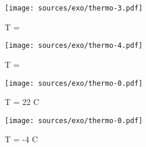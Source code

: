 \documentclass[11pt]{article}
\begin{document}
\begin{multicols}{4}
  \begin{figure}[H]
    \centering
    \texttt{[image: sources/exo/thermo-3.pdf]}
    \caption{T = }
  \end{figure}

  \begin{figure}[H]
    \centering
    \texttt{[image: sources/exo/thermo-4.pdf]}
    \caption{T = }
  \end{figure}

  \begin{figure}[H]
    \centering
    \texttt{[image: sources/exo/thermo-0.pdf]}
    \caption{T = 22  C}  
  \end{figure}

  \begin{figure}[H]
    \centering
    \texttt{[image: sources/exo/thermo-0.pdf]}
    \caption{T = -4  C}  
  \end{figure}

\end{multicols}
\end{document}
